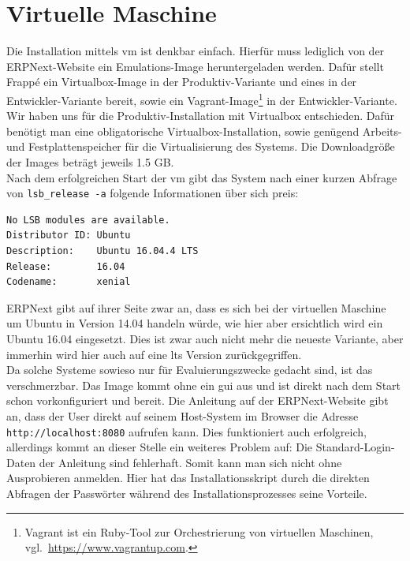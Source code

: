 \section{Virtuelle Maschine}
Die Installation mittels \gls{vm} ist denkbar einfach. Hierfür muss lediglich von der ERPNext-Website ein Emulations-Image heruntergeladen werden. Dafür stellt Frappé ein Virtualbox-Image in der Produktiv-Variante und eines in der Entwickler-Variante bereit, sowie ein Vagrant-Image\footnote{Vagrant ist ein Ruby-Tool zur Orchestrierung von virtuellen Maschinen, vgl.\ \url{https://www.vagrantup.com}.} in der Entwickler-Variante.\\
Wir haben uns für die Produktiv-Installation mit Virtualbox entschieden.
Dafür benötigt man eine obligatorische Virtualbox-Installation, sowie genügend Arbeits- und Festplattenspeicher für die Virtualisierung des Systems. Die Downloadgröße der Images beträgt jeweils 1.5 GB.\\ Nach dem erfolgreichen Start der \gls{vm} gibt das System nach einer kurzen Abfrage von \texttt{lsb\_release -a} folgende Informationen über sich preis:
\begin{verbatim}
No LSB modules are available.
Distributor ID: Ubuntu
Description:    Ubuntu 16.04.4 LTS
Release:        16.04
Codename:       xenial
\end{verbatim}
ERPNext gibt auf ihrer Seite zwar an, dass es sich bei der virtuellen Maschine um Ubuntu in Version 14.04 handeln würde, wie hier aber ersichtlich wird ein Ubuntu 16.04 eingesetzt. Dies ist zwar auch nicht mehr die neueste Variante, aber immerhin wird hier auch auf eine \gls{lts} Version zurückgegriffen.\\
Da solche Systeme sowieso nur für Evaluierungszwecke gedacht sind, ist das verschmerzbar.
Das Image kommt ohne ein \gls{gui} aus und ist direkt nach dem Start schon vorkonfiguriert und bereit. Die Anleitung auf der ERPNext-Website gibt an, dass der User direkt auf seinem Host-System im Browser die Adresse \texttt{http://localhost:8080} aufrufen kann. Dies funktioniert auch erfolgreich, allerdings kommt an dieser Stelle ein weiteres Problem auf: Die Standard-Login-Daten der Anleitung sind fehlerhaft. Somit kann man sich nicht ohne Ausprobieren anmelden. Hier hat das Installationsskript durch die direkten Abfragen der Passwörter während des Installationsprozesses seine Vorteile.

